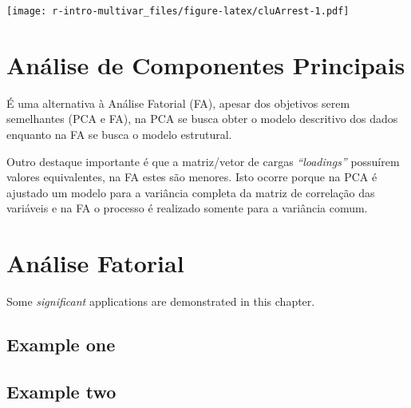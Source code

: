 \documentclass[]{book}
\begin{document}
\texttt{[image: r-intro-multivar\_files/figure-latex/cluArrest-1.pdf]}

\chapter{Análise de Componentes Principais}\label{PCA}

É uma alternativa à Análise Fatorial (FA), apesar dos objetivos serem
semelhantes (PCA e FA), na PCA se busca obter o modelo descritivo dos
dados enquanto na FA se busca o modelo estrutural.

Outro destaque importante é que a matriz/vetor de cargas
\emph{``loadings''} possuírem valores equivalentes, na FA estes são
menores. Isto ocorre porque na PCA é ajustado um modelo para a variância
completa da matriz de correlação das variáveis e na FA o processo é
realizado somente para a variância comum.

\chapter{Análise Fatorial}\label{FA}

Some \emph{significant} applications are demonstrated in this chapter.

\section{Example one}\label{example-one}

\section{Example two}\label{example-two}


\end{document}
